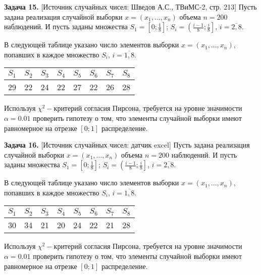 \textbf{Задача 15.} [Источник случайных чисел: Шведов А.С., ТВиМС-2, стр. 213] Пусть задана реализация случайной выборки $x=\left(x_{1} ,...,x_{n} \right)$ объема $n=200$ наблюдений. И пусть заданы множества $S_{1} =\left[0;{\tfrac{1}{8}} \right]$; $S_{i} =\left({\tfrac{i-1}{8}} ;{\tfrac{i}{8}} \right]$, $i=\overline{2,8}$. 

В следующей таблице указано число элементов выборки $x=\left(x_{1} ,...,x_{n} \right)$, попавших в каждое множество $S_{i} $, $i=\overline{1,8}$.

\begin{tabular}{|p{0.3in}|p{0.3in}|p{0.3in}|p{0.3in}|p{0.3in}|p{0.3in}|p{0.3in}|p{0.3in}|} \hline 
$S_{1} $ & $S_{2} $ & $S_{3} $ & $S_{4} $ & $S_{5} $ & $S_{6} $ & $S_{7} $ & $S_{8} $ \\ \hline 
29 & 22 & 24 & 22 & 27 & 22 & 26 & 28 \\ \hline 
\end{tabular}



Используя $\chi ^{2} -$критерий согласия Пирсона, требуется на уровне значимости $\alpha =0.01$ проверить гипотезу о том, что элементы случайной выборки имеют равномерное на отрезке $\left[0;1\right]$ распределение.



\textbf{Задача 16.} [Источник случайных чисел: датчик excel] Пусть задана реализация случайной выборки $x=\left(x_{1} ,...,x_{n} \right)$ объема $n=200$ наблюдений. И пусть заданы множества $S_{1} =\left[0;{\tfrac{1}{8}} \right]$; $S_{i} =\left({\tfrac{i-1}{8}} ;{\tfrac{i}{8}} \right]$, $i=\overline{2,8}$.

В следующей таблице указано число элементов выборки $x=\left(x_{1} ,...,x_{n} \right)$, попавших в каждое множество $S_{i} $, $i=\overline{1,8}$.

\begin{tabular}{|p{0.3in}|p{0.3in}|p{0.3in}|p{0.3in}|p{0.3in}|p{0.3in}|p{0.3in}|p{0.3in}|} \hline 
$S_{1} $ & $S_{2} $ & $S_{3} $ & $S_{4} $ & $S_{5} $ & $S_{6} $ & $S_{7} $ & $S_{8} $ \\ \hline 
30 & 34 & 21 & 20 & 24 & 22 & 21 & 28 \\ \hline 
\end{tabular}



Используя $\chi ^{2} -$критерий согласия Пирсона, требуется на уровне значимости $\alpha =0.01$ проверить гипотезу о том, что элементы случайной выборки имеют равномерное на отрезке $\left[0;1\right]$ распределение.

